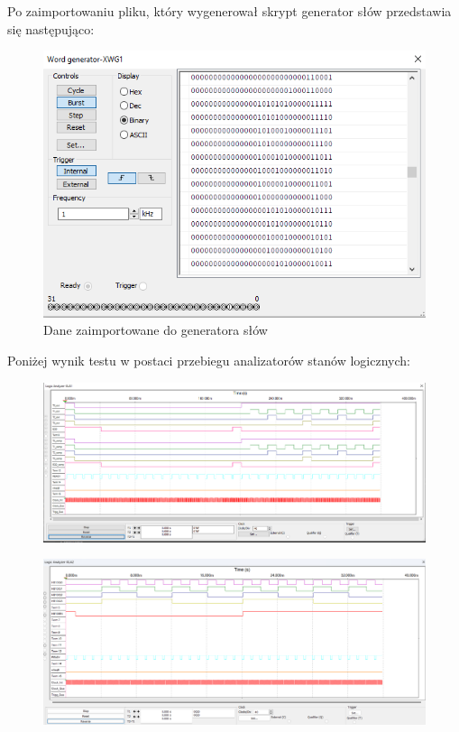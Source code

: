 \documentclass[a4paper]{article}
\begin{document}
Po zaimportowaniu pliku, który wygenerował skrypt generator słów przedstawia się następująco:
\begin{figure}[H]
    \centering

    \includegraphics{driver_test_word_generator.png}
    \caption{Dane zaimportowane do generatora słów}
\end{figure}
\pagebreak
Poniżej wynik testu w postaci przebiegu analizatorów stanów logicznych:
\begin{figure}[H]
    \centering
    \includegraphics[width=\textwidth]{component_test_logic_analyzer_xla1_driver.png}
\end{figure}
\begin{figure}[H]
    \centering
    \includegraphics[width=\textwidth]{component_test_logic_analyzer_xla2_driver.png}
\end{figure}
\pagebreak
\end{document}
